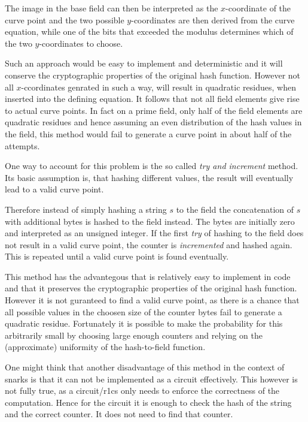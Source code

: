 The image in the base field can then be interpreted as the $x$-coordinate of the curve point and the two possible $y$-coordinates are then derived from the curve equation, while one of the bits that exceeded the modulus determines which of the two $y$-coordinates to choose.

Such an approach would be easy to implement and deterministic and it will conserve the cryptographic properties of the original hash function. However not all $x$-ccordinates genrated in such a way, will result in quadratic residues, when inserted into the defining equation. It follows that not all field elements give rise to actual curve points. In fact
on a prime field, only half of the field elements are quadratic residues and hence assuming an even distribution of the hash values in the field, this method would fail to generate a curve point in about half of the attempts. 

One way to account for this problem is the so called \textit{try and increment} method. Its basic assumption is, that hashing different values, the result will eventually lead to a valid curve point. 

Therefore instead of simply hashing a string $s$ to the field the concatenation of $s$ with additional bytes is hashed to the field instead. The bytes are initially zero and interpreted as an unsigned integer. If the first \textit{try} of hashing to the field does not result in a valid curve point, the counter is \textit{incremented} and hashed again. This is repeated until a valid curve point is found eventually.

This method has the advantegous that is relatively easy to implement in code and that it preserves the cryptographic properties of the original hash function. However it is not guranteed to find a valid curve point, as there is a chance that all possible values in the choosen size of the counter bytes fail to generate a quadratic residue. Fortunately it is possible to make the probability for this arbitrarily small by choosing large enough counters and relying on the (approximate) uniformity of the hash-to-field function. 

One might think that another disadvantage of this method in the context of snarks is that it can not be implemented as a circuit effectively. This however is not fully true, as a circuit/r1cs only needs to enforce the correctness of the computation. Hence for the circuit it is enough to check the hash of the string and the correct counter. It does not need to find that counter.

